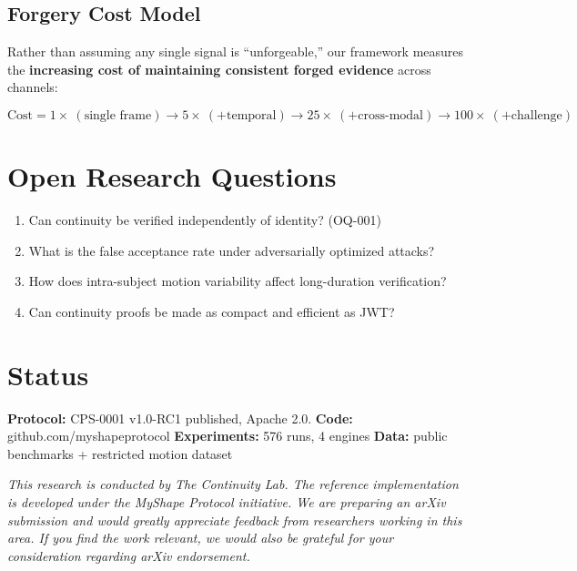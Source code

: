 \documentclass[10pt]{article}
\begin{document}
\subsection*{Forgery Cost Model}

Rather than assuming any single signal is ``unforgeable,'' our framework measures the \textbf{increasing cost of maintaining consistent forged evidence} across channels:

\[
\text{Cost} = 1\times\ (\text{single frame}) \rightarrow 5\times\ (+\text{temporal}) \rightarrow 25\times\ (+\text{cross-modal}) \rightarrow 100\times\ (+\text{challenge})
\]

\section*{Open Research Questions}

\begin{enumerate}
  \item Can continuity be verified independently of identity? (OQ-001)
  \item What is the false acceptance rate under adversarially optimized attacks?
  \item How does intra-subject motion variability affect long-duration verification?
  \item Can continuity proofs be made as compact and efficient as JWT?
\end{enumerate}

\section*{Status}

\textbf{Protocol:} CPS-0001 v1.0-RC1 published, Apache 2.0. \hfill
\textbf{Code:} github.com/myshapeprotocol \hfill
\textbf{Experiments:} 576 runs, 4 engines \hfill
\textbf{Data:} public benchmarks + restricted motion dataset \hfill

\medskip
\noindent\small\textit{This research is conducted by The Continuity Lab. The reference implementation is developed under the MyShape Protocol initiative. We are preparing an arXiv submission and would greatly appreciate feedback from researchers working in this area. If you find the work relevant, we would also be grateful for your consideration regarding arXiv endorsement.}
\end{document}
